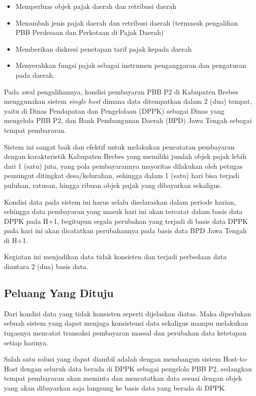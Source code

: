 \documentclass[pdftex, 12pt, oneside]{article}
\begin{document}
\begin{itemize}
  \item Memperluas objek pajak daerah dan retribusi daerah
  \item Menambah jenis pajak daerah dan retribusi daerah (termasuk pengalihan PBB Perdesaan dan Perkotaan di Pajak Daerah)
  \item Memberikan diskresi penetapan tarif pajak kepada daerah
  \item Menyerahkan fungsi pajak sebagai instrumen penganggaran dan pengaturan pada daerah.
\end{itemize}

Pada awal pengalihannya, kondisi pembayaran PBB P2 di Kabupaten Brebes menggunakan sistem \textit{single host} dimana data ditempatkan dalam 2 (dua) tempat, yaitu di Dinas Pendapatan dan Pengelolaan (DPPK) sebagai Dinas yang mengelola PBB P2, dan Bank Pembangunan Daerah (BPD) Jawa Tengah sebagai tempat pembayaran. 

Sistem ini sangat baik dan efektif untuk melakukan pencatatan pembayaran dengan karakteristik Kabupaten Brebes yang memiliki jumlah objek pajak lebih dari 1 (satu) juta, yang pola pembayarannya mayoritas dilakukan oleh petugas pemungut ditingkat desa/kelurahan, sehingga dalam 1 (satu) hari bisa terjadi puluhan, ratusan, hingga ribuan objek pajak yang dibayarkan sekaligus.

Kondisi data pada sistem ini harus selalu diselaraskan dalam periode harian, sehingga data pembayaran yang masuk hari ini akan tercatat dalam basis data DPPK pada H+1, begitupun segala perubahan yang terjadi di basis data DPPK pada hari ini akan dicatatkan perubahannya pada basis data BPD Jawa Tengah di H+1.

Kegiatan ini menjadikan data tidak konsisten dan terjadi perbedaan data diantara 2 (dua) basis data.

\subsection{Peluang Yang Dituju}

Dari kondisi data yang tidak konsisten seperti dijelaskan diatas. Maka diperlukan sebuah sistem yang dapat menjaga konsistensi data sekaligus mampu melakukan tugasnya mencatat transaksi pembayaran massal dan perubahan data ketetapan setiap harinya.

Salah satu solusi yang dapat diambil adalah dengan membangun sistem Host-to-Host dengan seluruh data berada di DPPK sebagai pengelola PBB P2, sedangkan tempat pembayaran akan meminta dan mencatatkan data sesuai dengan objek yang akan dibayarkan saja langsung ke basis data yang berada di DPPK.
                              
\end{document}
